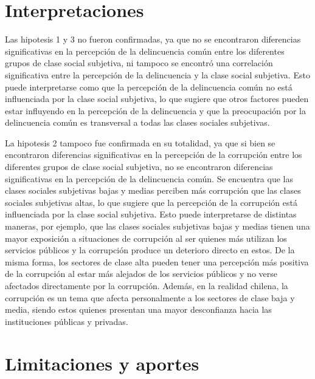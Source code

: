 \documentclass[
  spanish,
  a4paper,
  oneside]{scrbook}
\begin{document}
\section{Interpretaciones}\label{interpretaciones}

Las hipotesis 1 y 3 no fueron confirmadas, ya que no se encontraron
diferencias significativas en la percepción de la delincuencia común
entre los diferentes grupos de clase social subjetiva, ni tampoco se
encontró una correlación significativa entre la percepción de la
delincuencia y la clase social subjetiva. Esto puede interpretarse como
que la percepción de la delincuencia común no está influenciada por la
clase social subjetiva, lo que sugiere que otros factores pueden estar
influyendo en la percepción de la delincuencia y que la preocupación por
la delincuencia común es transversal a todas las clases sociales
subjetivas.

La hipotesis 2 tampoco fue confirmada en su totalidad, ya que si bien se
encontraron diferencias significativas en la percepción de la corrupción
entre los diferentes grupos de clase social subjetiva, no se encontraron
diferencias significativas en la percepción de la delincuencia común. Se
encuentra que las clases sociales subjetivas bajas y medias perciben más
corrupción que las clases sociales subjetivas altas, lo que sugiere que
la percepción de la corrupción está influenciada por la clase social
subjetiva. Esto puede interpretarse de distintas maneras, por ejemplo,
que las clases sociales subjetivas bajas y medias tienen una mayor
exposición a situaciones de corrupción al ser quienes más utilizan los
servicios públicos y la corrupción produce un deterioro directo en
estos. De la misma forma, los sectores de clase alta pueden tener una
percepción más positiva de la corrupción al estar más alejados de los
servicios públicos y no verse afectados directamente por la corrupción.
Además, en la realidad chilena, la corrupción es un tema que afecta
personalmente a los sectores de clase baja y media, siendo estos quienes
presentan una mayor desconfianza hacia las instituciones públicas y
privadas.

\section{Limitaciones y aportes}\label{limitaciones-y-aportes}
\end{document}
